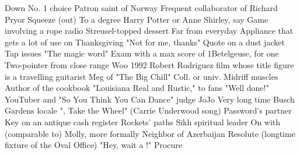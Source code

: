 \begin{clues}{Down}
     No. 1 choice
     Patron saint of Norway
     Frequent collaborator of Richard Pryor
     Squeeze (out)
     To a degree
     Harry Potter or Anne Shirley, say
     Game involving a rope
     {\blank} radio
     Streusel-topped dessert
     Far from everyday
     Appliance that gets a lot of use on Thanksgiving
     "Not for me, thanks"
     Quote on a dust jacket
     Tap issues
     "The magic word"
     Exam with a max score of 1Betelgeuse, for one
     Two-pointer from close range
     Woo
     1992 Robert Rodriguez film whose title figure is a travelling guitarist
     Meg of "The Big Chill"
     Coll. or univ.
     Midriff muscles
     Author of the cookbook "Louisiana Real and Rustic," to fans
     "Well done!"
     YouTuber and "So You Think You Can Dance" judge JoJo
     Very long time
     Busch Gardens locale
     "{\blank}, Take the Wheel" (Carrie Underwood song)
     Password's partner
     Key on an antique cash register
     Rockets' paths
     Sikh spiritual leader
     On {\blank} with (comparable to)
     Molly, more formally
     Neighbor of Azerbaijan
     Resolute {\blank} (longtime fixture of the Oval Office)
     "Hey, wait a {\blank}!"
     Procure
\end{clues}
